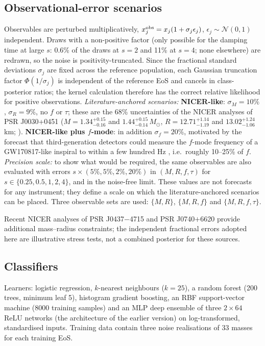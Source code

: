 \documentclass[11pt,a4paper]{article}
\newcommand{\Msun}{M_\odot}
\begin{document}
\subsection{Observational-error scenarios}\label{sec:errors}
Observables are perturbed multiplicatively, $x_j^{\rm obs}=x_j(1+\sigma_j\epsilon_j)$, $\epsilon_j\sim\mathcal N(0,1)$ independent. Draws with a non-positive factor (only possible for the damping time at large $s$: 0.6\% of the draws at $s=2$ and 11\% at $s=4$; none elsewhere) are redrawn, so the noise is positivity-truncated. Since the fractional standard deviations $\sigma_j$ are fixed across the reference population, each Gaussian truncation factor $\Phi(1/\sigma_j)$ is independent of the reference EoS and cancels in class-posterior ratios; the kernel calculation therefore has the correct relative likelihood for positive observations.
\emph{Literature-anchored scenarios:}
\textbf{NICER-like}: $\sigma_M=10\%$, $\sigma_R=9\%$, no $f$ or $\tau$; these are the 68\% uncertainties of the NICER analyses of PSR J0030+0451 ($M=1.34^{+0.15}_{-0.16}$ and $1.44^{+0.15}_{-0.14}\,\Msun$, $R=12.71^{+1.14}_{-1.19}$ and $13.02^{+1.24}_{-1.06}$\,km; \citealt{Riley19,Miller19}).
\textbf{NICER-like plus $f$-mode}: in addition $\sigma_f=20\%$, motivated by the forecast that third-generation detectors could measure the $f$-mode frequency of a GW170817-like inspiral to within a few hundred Hz \citep{Williams22}, i.e.\ roughly 10--25\% of $f$.
\emph{Precision scale:} to show what would be required, the same observables are also evaluated with errors $s\times(5\%,5\%,2\%,20\%)$ in $(M,R,f,\tau)$ for $s\in\{0.25,0.5,1,2,4\}$, and in the noise-free limit. These values are not forecasts for any instrument; they define a scale on which the literature-anchored scenarios can be placed. Three observable sets are used: $\{M,R\}$, $\{M,R,f\}$ and $\{M,R,f,\tau\}$.

Recent NICER analyses of PSR J0437$-$4715 and PSR J0740$+$6620 \citep{Choudhury24,Salmi24} provide additional mass--radius constraints; the independent fractional errors adopted here are illustrative stress tests, not a combined posterior for these sources.

\subsection{Classifiers}
Learners: logistic regression, $k$-nearest neighbours ($k=25$), a random forest (200 trees, minimum leaf 5), histogram gradient boosting, an RBF support-vector machine (8000 training samples) and an MLP deep ensemble \citep{Lakshminarayanan17} of three $2\times64$ ReLU networks (the architecture of the earlier version) on log-transformed, standardised inputs. Training data contain three noise realisations of 33 masses for each training EoS.
\end{document}
